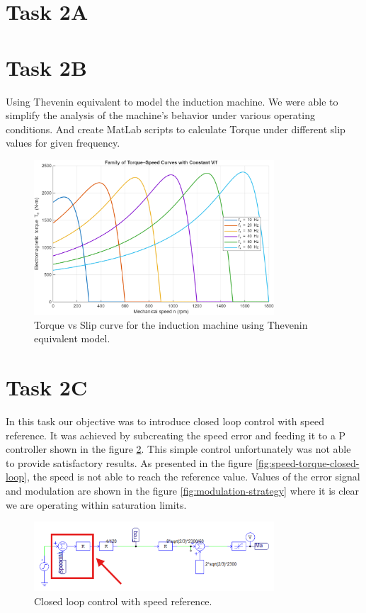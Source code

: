 \documentclass[12pt,a4paper]{report}
\begin{document}
\section{Task 2A}
\label{sec:task-2a}

\section{Task 2B}
\label{sec:task-2b}

Using Thevenin equivalent to model the induction machine. We were able to simplify the analysis of the machine's behavior under various operating conditions.
And create MatLab scripts to calculate Torque under different slip values for given frequency.

\begin{figure}[H]
    \centering
    \includegraphics[width=0.8\textwidth]{Matlab2b.png}
    \caption{Torque vs Slip curve for the induction machine using Thevenin equivalent model.}
    \label{fig:torque-slip-curve}
\end{figure}
\newpage
\section{Task 2C}
\label{sec:task-2c}

In this task our objective was to introduce closed loop control with speed reference.
It was achieved by subcreating the speed error and feeding it to a P controller shown in the figure \ref{fig:gain-control}.
This simple control unfortunately was not able to provide satisfactory results.
As presented in the figure \ref{fig:speed-torque-closed-loop}, the speed is not able to reach the reference value.
Values of the error signal and modulation are shown in the figure \ref{fig:modulation-strategy} where it is clear we are operating within saturation limits.
\begin{figure}[H]
    \centering
    \includegraphics[width=0.8\textwidth]{GainCtrl.png}
    \caption{Closed loop control with speed reference.}
    \label{fig:gain-control}
\end{figure}
\end{document}
